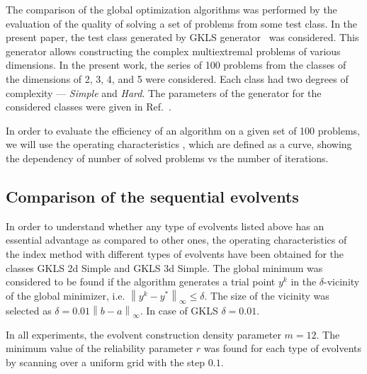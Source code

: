 \documentclass[procedia]{easychair}
\begin{document}
The comparison of the global optimization algorithms was performed by the evaluation of the
quality of solving a set of problems from some test class.
In the present paper, the test class generated by GKLS generator~\cite{Gaviano2003} was
considered. This generator allows constructing the complex multiextremal problems of various
dimensions. In the present work, the series of 100 problems from the classes of the dimensions
of 2, 3, 4, and 5 were considered.
Each class had two degrees of complexity --- \textit{Simple} and \textit{Hard}. The parameters
of the generator for the considered classes were given in Ref.~\cite{Gaviano2003}.

In order to evaluate the efficiency of an algorithm on a given set of 100 problems, we will use
the operating characteristics \cite{grishaginClass}, which are defined as a
curve, showing the dependency of number of solved problems vs the number of iterations.

\subsection{Comparison of the sequential evolvents}
\label{sec:seq_comp}
In order to understand whether any type of evolvents listed above has an essential advantage as
compared to other ones, the operating characteristics of the index method with different types
of evolvents have been obtained for the classes GKLS 2d Simple and GKLS 3d Simple. The
global minimum was considered to be found if the algorithm generates a trial point $y^k$ in the
$\delta$-vicinity of the global minimizer, i.e. $\left\|y^k-y^\ast\right\|_\infty\leq\delta$. The size
of the vicinity was selected as $\delta = 0.01\left\|b-a\right\|_\infty$. In case of GKLS
$\delta=0.01$.

In all experiments, the evolvent construction density parameter $m=12$. The minimum value of
the reliability parameter \(r\) was found for each type of evolvents by scanning over a uniform grid
with the step \(0.1\).
\end{document}
